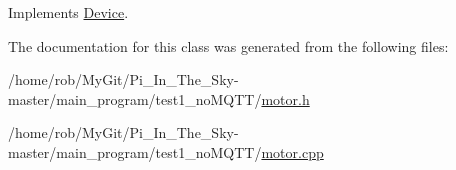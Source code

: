 Implements \hyperlink{class_device_aab20e3f9dc696c6a1153776d526dcc0b}{Device}.



The documentation for this class was generated from the following files\+:\begin{DoxyCompactItemize}
\item 
/home/rob/\+My\+Git/\+Pi\+\_\+\+In\+\_\+\+The\+\_\+\+Sky-\/master/main\+\_\+program/test1\+\_\+no\+M\+Q\+T\+T/\hyperlink{test1__no_m_q_t_t_2motor_8h}{motor.\+h}\item 
/home/rob/\+My\+Git/\+Pi\+\_\+\+In\+\_\+\+The\+\_\+\+Sky-\/master/main\+\_\+program/test1\+\_\+no\+M\+Q\+T\+T/\hyperlink{test1__no_m_q_t_t_2motor_8cpp}{motor.\+cpp}\end{DoxyCompactItemize}
